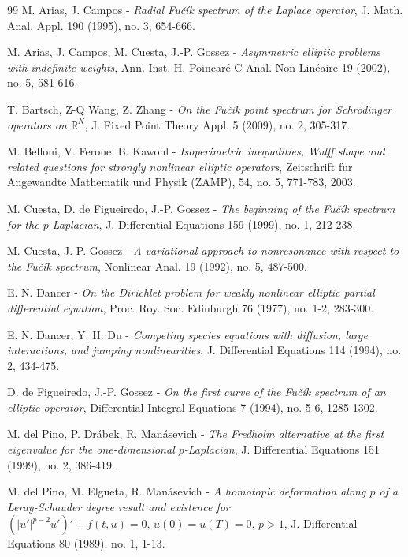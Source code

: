 \documentclass[a4paper,11pt]{article}
\newcommand{\R}{\mathbb{R}}
\begin{document}
{\begin{thebibliography}{99}
{M. Arias, J. Campos} - \textit{Radial Fu\v cík spectrum of the Laplace operator}, J. Math. Anal. Appl. 190 (1995), no. 3, 654-666.

{M. Arias, J. Campos, M. Cuesta, J.-P. Gossez} - \textit{Asymmetric elliptic problems with indefinite weights}, Ann. Inst. H. Poincaré C Anal. Non Linéaire 19 (2002), no. 5, 581-616.

{T. Bartsch, Z-Q Wang, Z. Zhang} - \textit{On the Fu\v cik point spectrum for Schr\"{o}dinger operators on $\R^N$}, J. Fixed Point Theory Appl. 5 (2009), no. 2, 305-317.

{M. Belloni, V. Ferone, B. Kawohl} - \textit{Isoperimetric inequalities, Wulff shape and related questions for strongly nonlinear elliptic operators}, Zeitschrift fur Angewandte Mathematik und Physik (ZAMP), 54, no. 5, 771-783, 2003.

{M. Cuesta, D. de Figueiredo, J.-P. Gossez} - \textit{The beginning of the Fu\v cík spectrum for the $p$-Laplacian}, J. Differential Equations 159 (1999), no. 1, 212-238.

{M. Cuesta, J.-P. Gossez} - \textit{A variational approach to nonresonance with respect to the Fu\v cík spectrum}, Nonlinear Anal. 19 (1992), no. 5, 487-500.

{E. N. Dancer} - \textit{On the Dirichlet problem for weakly nonlinear elliptic partial differential equation}, Proc. Roy. Soc. Edinburgh 76 (1977), no. 1-2, 283-300.

{E. N. Dancer, Y. H. Du} - \textit{Competing species equations with diffusion, large interactions, and jumping nonlinearities}, J. Differential Equations 114 (1994), no. 2, 434-475.

{D. de Figueiredo, J.-P. Gossez} - \textit{On the first curve of the Fu\v cík spectrum of an elliptic operator}, Differential Integral Equations 7 (1994), no. 5-6, 1285-1302.

{M. del Pino, P. Drábek, R. Manásevich} - \textit{The Fredholm alternative at the first eigenvalue for the one-dimensional $p$-Laplacian}, J. Differential Equations 151 (1999), no. 2, 386-419.

{M. del Pino, M. Elgueta, R. Manásevich} - \textit{A homotopic deformation along $p$ of a Leray-Schauder degree result and existence for $(|u'|^{p-2}u')'+f(t,u)=0,\, u(0)=u(T)=0,\, p>1$}, J. Differential Equations 80 (1989), no. 1, 1-13.


\end{thebibliography}}
\end{document}
